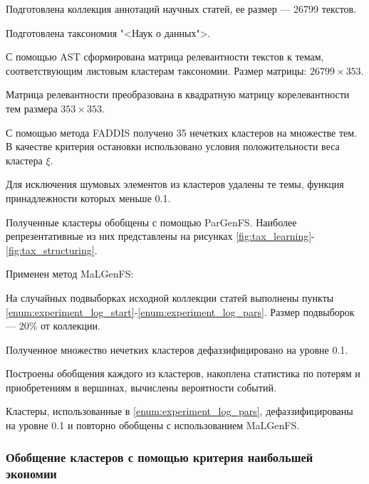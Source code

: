 \documentclass[12pt]{article}
\newenvironment{enumerate*}%
{\begin{enumerate}%
	\setlength{\itemsep}{0pt}%
	\setlength{\parskip}{0pt}}%
{\end{enumerate}}
\newenvironment{alphaenumerate*}
{\begin{enumerate}[label=(\asbuk*), ref=(\asbuk*)]
	\setlength{\itemsep}{0pt}
	\setlength{\parskip}{0pt}}
{\end{enumerate}}
\begin{document}
\begin{enumerate*}
	\item\label{enum:experiment_log_start} Подготовлена коллекция аннотаций научных статей, ее размер --- 26799 текстов.
	\item Подготовлена таксономия "<Наук о данных">.
	\item С помощью AST сформирована матрица релевантности текстов к темам, соответствующим листовым кластерам таксономии. Размер матрицы: $26799 \times 353$.
	\item Матрица релевантности преобразована в квадратную матрицу корелевантности тем размера  $353\times 353$.
	\item\label{enum:experiment_log_faddis} С помощью метода FADDIS получено 35 нечетких кластеров на множестве тем. В качестве критерия остановки использовано условия положительности веса кластера $\xi$. 
	\item Для исключения шумовых элементов из кластеров удалены те темы, функция принадлежности которых меньше 0.1.
	\item\label{enum:experiment_log_pars} Полученные кластеры обобщены с помощью ParGenFS. Наиболее репрезентативные из них представлены на рисунках \ref{fig:tax_learning}-\ref{fig:tax_structuring}.
	\item Применен метод MaLGenFS:
	\begin{alphaenumerate*}
		\item На случайных подвыборках исходной коллекции статей выполнены пункты \ref{enum:experiment_log_start}-\ref{enum:experiment_log_pars}. Размер подвыборок --- 20\% от коллекции.
		\item Полученное множество нечетких кластеров дефаззифицировано на уровне 0.1.
		\item Построены обобщения каждого из кластеров, накоплена статистика по потерям и приобретениям в вершинах, вычислены вероятности событий.
		\item Кластеры, использованные в \ref{enum:experiment_log_pars}, дефаззифицированы на уровне 0.1 и повторно обобщены с использованием MaLGenFS.
	\end{alphaenumerate*}
\end{enumerate*}

\subsubsection{Обобщение кластеров с помощью критерия наибольшей экономии}
\end{document}
